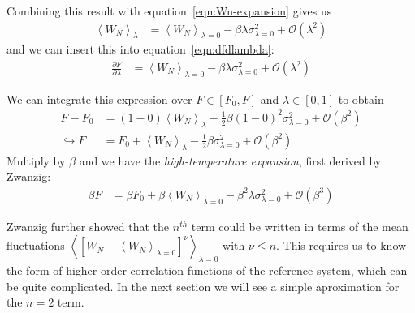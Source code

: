 \documentclass[letterpaper,twocolumn,amsmath,amssymb,prb]{revtex4-1}
\newcommand{\1}{\ensuremath{\textbf{r}_1}}
\newcommand{\2}{\ensuremath{\textbf{r}_2}}
\newcommand{\3}{\ensuremath{\textbf{r}_3}}
\newcommand{\4}{\ensuremath{\textbf{r}_4}}
\begin{document}
Combining this result with equation~\ref{eqn:Wn-expansion} gives us
\begin{align}
  \left\langle W_N \right\rangle_\lambda &= \left\langle W_N\right\rangle_{\lambda = 0} - \beta\lambda\sigma_{\lambda=0}^2 + \mathcal{O}(\lambda^2) \label{eqn:Wn-expansion-simplified}
\end{align}
and we can insert this into equation~\ref{eqn:dfdlambda}:
\begin{align}
  \frac{\partial F}{\partial\lambda} &= \left\langle W_N\right\rangle_{\lambda = 0} - \beta\lambda\sigma_{\lambda=0}^2 + \mathcal{O}(\lambda^2)
\end{align}

We can integrate this expression over $F\in[F_0,F]$ and $\lambda\in[0,1]$ to obtain
\begin{align}
  F - F_0 &= (1-0)\left\langle W_N \right\rangle_\lambda - \frac{1}{2}\beta(1 - 0)^2\sigma_{\lambda=0}^2 + \mathcal{O}(\beta^2) \nonumber \\
  \hookrightarrow F &= F_0 + \left\langle W_N \right\rangle_\lambda - \frac{1}{2}\beta\sigma_{\lambda=0}^2 + \mathcal{O}(\beta^2) \label{eqn:F-inTermsW}
\end{align}
Multiply by $\beta$ and we have the \emph{high-temperature expansion}, first derived by
Zwanzig:\cite{Zwanzig54}
\begin{align}
  \beta F &= \beta F_0 + \beta \left\langle W_N \right\rangle_{\lambda=0} - \beta^2\lambda\sigma_{\lambda=0}^2 + \mathcal{O}(\beta^3)
\end{align}

Zwanzig further showed that the $n^{th}$ term could be written in terms of the mean fluctuations $\left\langle \left[ W_N - \left\langle W_N\right\rangle_{\lambda=0} \right]^\nu \right\rangle_{\lambda=0}$ with $\nu \leq n$. This requires us to know the form of higher-order correlation functions of the reference system, which can be quite complicated. In the next section we will see a simple aproximation for the $n=2$ term.
\end{document}
